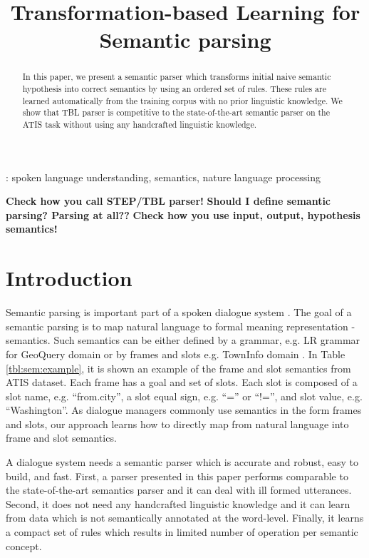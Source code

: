 \documentclass{article}
\title{Transformation-based Learning for Semantic parsing}
\begin{document}
\maketitle
%
\begin{abstract}
In this paper, we present a semantic parser which transforms initial naive semantic hypothesis into correct semantics by using an ordered set of rules. These rules are learned automatically from the training corpus with no prior linguistic knowledge. We show that TBL parser is competitive to the state-of-the-art semantic parser on the ATIS task without using any handcrafted linguistic knowledge.
\end{abstract}

: spoken language understanding, semantics, nature language processing

\textbf{Check how you call STEP/TBL parser!} 
\textbf{Should I define semantic parsing? Parsing at all??}
\textbf{Check how you use input, output, hypothesis semantics!}

\section{Introduction}
Semantic parsing is important part of a spoken dialogue system \cite{williams07}. The goal of a semantic parsing is to map natural language to formal meaning representation - semantics. Such semantics can be either defined by a grammar, e.g. LR grammar for GeoQuery domain \cite{kate05} or by frames and slots e.g. TownInfo domain \cite{thomson08}. In Table \ref{tbl:sem:example}, it is shown an example of the frame and slot semantics from ATIS dataset. Each frame has a goal and set of slots. Each slot is composed of a slot name, e.g. ``from.city'', a slot equal sign, e.g. ``='' or ``!='', and slot value, e.g. ``Washington''. As dialogue managers commonly use semantics in the form frames and slots, our approach learns how to directly map from natural language into frame and slot semantics.



A dialogue system needs a semantic parser which is accurate and robust, easy to build, and fast. First, a parser presented in this paper performs comparable to the state-of-the-art semantics parser and it can deal with ill formed utterances. Second, it does not need any handcrafted linguistic knowledge and it can learn from data which is not semantically annotated at the word-level. Finally, it learns a compact set of rules which results in limited number of operation per semantic concept.
\end{document}
